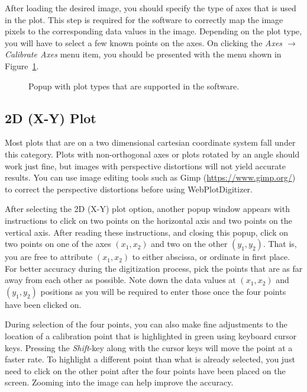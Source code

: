 \documentclass[letterpaper, 11pt]{article}
\begin{document}
After loading the desired image, you should specify the type of axes that is used in the plot. This step is required for the software to correctly map the image pixels to the corresponding data values in the image. Depending on the plot type, you will have to select a few known points on the axes. On clicking the \emph{Axes $\rightarrow$ Calibrate Axes} menu item, you should be presented with the menu shown in Figure~\ref{fig:defineAxesPopup}.

\begin{figure}
\begin{center}
\caption{Popup with plot types that are supported in the software.}
\label{fig:defineAxesPopup}
\end{center}
\end{figure}

\subsection{2D (X-Y) Plot}
Most plots that are on a two dimensional cartesian coordinate system fall under this category. Plots with non-orthogonal axes or plots rotated by an angle should work just fine, but images with perspective distortions will not yield accurate results. You can use image editing tools such as Gimp (\url{https://www.gimp.org/}) to correct the perspective distortions before using WebPlotDigitizer.

After selecting the 2D (X-Y) plot option, another popup window appears with instructions to click on two points on the horizontal axis and two points on the vertical axis. After reading these instructions, and closing this popup, click on two points on one of the axes $(x_1, x_2)$ and two on the other $(y_1, y_2)$. That is, you are free to attribute $(x_1, x_2)$ to either abscissa, or ordinate in first place. For better accuracy during the digitization process, pick the points that are as far away from each other as possible. Note down the data values at $(x_1, x_2)$ and $(y_1, y_2)$ positions as you will be required to enter those once the four points have been clicked on.

During selection of the four points, you can also make fine adjustments to the location of a calibration point that is highlighted in green using keyboard cursor keys. Pressing the \emph{Shift}-key along with the cursor keys will move the point at a faster rate. To highlight a different point than what is already selected, you just need to click on the other point after the four points have been placed on the screen. Zooming into the image can help improve the accuracy.
\end{document}
